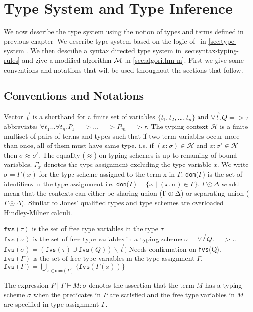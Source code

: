 \chapter{Type System and Type Inference}
We now describe the type system using the notion of types and terms defined in previous
chapter. We describe type system based on the logic of \BI\ in \cref{sec:type-system}. We then describe a
syntax directed type system in \cref{sec:syntax-typing-rules} and give a modified algorithm $\mathcal{M}$ in \cref{sec:algorithm-m}.
First we give some conventions and notations that will be used throughout the sections that follow.

\section{Conventions and Notations}
Vector $\vec{t}$ is a shorthand for a finite set of variables $\{t_1, t_2, \dots, t_n\}$ and $\forall \vec{t}. Q => \tau$
abbreviates $\forall t_1 \dots \forall t_n. P_1 => \dots => P_m => \tau$.
The typing context $\mathcal{H}$ is a finite multiset of pairs of terms and types such that if two term variables occur
more than once, all of them must have same type. i.e. if $(x:\sigma) \in \mathcal{H}$ and $x:\sigma' \in \mathcal{H}$ then $\sigma \approx \sigma'$.
The equality ($\approx$) on typing schemes is up-to renaming of bound variables.
$\Gamma_{x}$ denotes the type assignment excluding the type variable $x$.
We write $\sigma = \Gamma(x)$ for the type scheme assigned to the term x in $\Gamma$.
\texttt{dom}($\Gamma$) is the set of identifiers in the type assignment i.e.
\texttt{dom}($\Gamma$) = $\{ x \mid (x:\sigma) \in \Gamma\}$.
$\Gamma \odot \Delta$ would mean that the contexts can either
be sharing union ($\Gamma \varoplus \Delta$) or separating union ($\Gamma \circledast \Delta$).
Similar to Jones' \citeyearpar{jones_theory_1994} qualified types and type schemes are overloaded Hindley-Milner calculi.
\begin{defn}
  $\texttt{fvs}(\tau)$ is the set of free type variables in the type $\tau$\\
  $\texttt{fvs}(\sigma)$ is the set of free type variables in a typing scheme $\sigma = \forall \vec{t} Q. => \tau$.\\
  $\texttt{fvs}(\sigma) = (\texttt{fvs}(\tau) \cup \texttt{fvs}(Q)) \backslash \vec{t})${\color{red} Needs confirmation on \texttt{fvs}(Q).}\\
  $\texttt{fvs}(\Gamma)$ is the set of free type variables in the type assignment $\Gamma$.\\
  $\texttt{fvs}(\Gamma) = \bigcup_{x \in \texttt{dom}(\Gamma)} \{ \texttt{fvs}(\Gamma(x)) \}$
\end{defn}
\begin{defn}
The expression $P \mid \Gamma \vdash M : \sigma$ denotes the assertion that the term $M$ has a typing scheme $\sigma$
when the predicates in $P$ are satisfied and the free type variables in $M$ are specified in type assignment $\Gamma$.
\end{defn}

